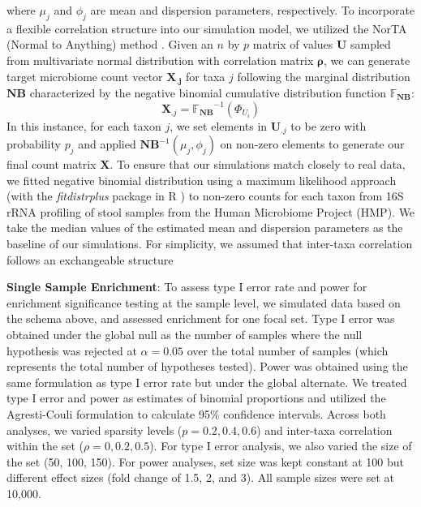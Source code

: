 \documentclass{article}
\begin{document}
where $\mu_j$ and $\phi_j$ are mean and dispersion parameters, respectively. To incorporate a flexible correlation structure into our simulation model, we utilized the NorTA (Normal to Anything) method \cite{cario1997}. Given an $n$ by $p$ matrix of values $\mathbf{U}$ sampled from multivariate normal distribution with correlation matrix $\mathbf{\rho}$, we can generate target microbiome count vector $\mathbf{X_{.j}}$ for taxa $j$ following the marginal distribution $\mathbf{NB}$ characterized by the negative binomial cumulative distribution function $\mathbb{F_{\mathbf{NB}}}$:
\begin{equation}
    \mathbf{X}_{.j} = \mathbb{F_{\mathbf{NB}}}^{-1}(\Phi_{U_i})
\end{equation}
In this instance, for each taxon $j$, we set elements in $\mathbf{U}_{.j}$ to be zero with probability $p_j$ and applied $\mathbf{NB}^{-1}(\mu_j, \phi_j)$ on non-zero elements to generate our final count matrix $\mathbf{X}$. To ensure that our simulations match closely to real data, we fitted negative binomial distribution using a maximum likelihood approach (with the \emph{fitdistrplus} package in R \cite{delignette-muller2015}) to non-zero counts for each taxon from 16S rRNA profiling of stool samples from the Human Microbiome Project (HMP). We take the median values of the estimated mean and dispersion parameters as the baseline of our simulations. For simplicity, we assumed that inter-taxa correlation follows an exchangeable structure

\noindent \textbf{Single Sample Enrichment}: To assess type I error rate and power for enrichment significance testing at the sample level, we simulated data based on the schema above, and assessed enrichment for one focal set. Type I error was obtained under the global null as the number of samples where the null hypothesis was rejected at $\alpha = 0.05$ over the total number of samples (which represents the total number of hypotheses tested). Power was obtained using the same formulation as type I error rate but under the global alternate. We treated type I error and power as estimates of binomial proportions and utilized the Agresti-Couli \cite{agresti1998} formulation to calculate 95\% confidence intervals. Across both analyses, we varied sparsity levels ($p = 0.2, 0.4, 0.6$) and inter-taxa correlation within the set ($\rho = 0, 0.2, 0.5$). For type I error analysis, we also varied the size of the set (50, 100, 150). For power analyses, set size was kept constant at 100 but different effect sizes (fold change of 1.5, 2, and 3). All sample sizes were set at 10,000. 
\end{document}
